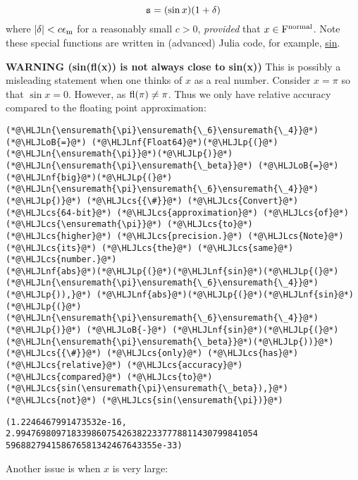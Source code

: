 \documentclass[12pt,a4paper]{article}
\newcommand{\HLJLn}[1]{#1}
\newcommand{\HLJLnf}[1]{\textcolor[RGB]{66,102,213}{#1}}
\newcommand{\HLJLoB}[1]{\textcolor[RGB]{102,102,102}{\textbf{#1}}}
\newcommand{\HLJLp}[1]{#1}
\newcommand{\HLJLcs}[1]{\textcolor[RGB]{153,153,119}{\textit{#1}}}
\begin{document}
\[
{\tt s} = (\sin x) ( 1 + \delta)
\]
where $|\delta| < c\ensuremath{\epsilon}_{\rm m}$ for a reasonably small $c > 0$, \emph{provided} that $x \in {\rm F}^{\rm normal}$. Note these special functions are written in (advanced) Julia code, for example, \href{https://github.com/JuliaLang/julia/blob/d08b05df6f01cf4ec6e4c28ad94cedda76cc62e8/base/special/trig.jl#L76}{sin}.

\textbf{WARNING (sin(fl(x)) is not always close to sin(x))} This is possibly a misleading statement when one thinks of $x$ as a real number. Consider $x = \pi$ so that $\sin x = 0$. However, as ${\rm fl}(\pi) \neq \pi$. Thus we only have relative accuracy compared to the floating point approximation:


\begin{lstlisting}
(*@\HLJLn{\ensuremath{\pi}\ensuremath{\_6}\ensuremath{\_4}}@*) (*@\HLJLoB{=}@*) (*@\HLJLnf{Float64}@*)(*@\HLJLp{(}@*)(*@\HLJLn{\ensuremath{\pi}}@*)(*@\HLJLp{)}@*)
(*@\HLJLn{\ensuremath{\pi}\ensuremath{\_beta}}@*) (*@\HLJLoB{=}@*) (*@\HLJLnf{big}@*)(*@\HLJLp{(}@*)(*@\HLJLn{\ensuremath{\pi}\ensuremath{\_6}\ensuremath{\_4}}@*)(*@\HLJLp{)}@*) (*@\HLJLcs{{\#}}@*) (*@\HLJLcs{Convert}@*) (*@\HLJLcs{64-bit}@*) (*@\HLJLcs{approximation}@*) (*@\HLJLcs{of}@*) (*@\HLJLcs{\ensuremath{\pi}}@*) (*@\HLJLcs{to}@*) (*@\HLJLcs{higher}@*) (*@\HLJLcs{precision.}@*) (*@\HLJLcs{Note}@*) (*@\HLJLcs{its}@*) (*@\HLJLcs{the}@*) (*@\HLJLcs{same}@*) (*@\HLJLcs{number.}@*)
(*@\HLJLnf{abs}@*)(*@\HLJLp{(}@*)(*@\HLJLnf{sin}@*)(*@\HLJLp{(}@*)(*@\HLJLn{\ensuremath{\pi}\ensuremath{\_6}\ensuremath{\_4}}@*)(*@\HLJLp{)),}@*) (*@\HLJLnf{abs}@*)(*@\HLJLp{(}@*)(*@\HLJLnf{sin}@*)(*@\HLJLp{(}@*)(*@\HLJLn{\ensuremath{\pi}\ensuremath{\_6}\ensuremath{\_4}}@*)(*@\HLJLp{)}@*) (*@\HLJLoB{-}@*) (*@\HLJLnf{sin}@*)(*@\HLJLp{(}@*)(*@\HLJLn{\ensuremath{\pi}\ensuremath{\_beta}}@*)(*@\HLJLp{))}@*) (*@\HLJLcs{{\#}}@*) (*@\HLJLcs{only}@*) (*@\HLJLcs{has}@*) (*@\HLJLcs{relative}@*) (*@\HLJLcs{accuracy}@*) (*@\HLJLcs{compared}@*) (*@\HLJLcs{to}@*) (*@\HLJLcs{sin(\ensuremath{\pi}\ensuremath{\_beta}),}@*) (*@\HLJLcs{not}@*) (*@\HLJLcs{sin(\ensuremath{\pi})}@*)
\end{lstlisting}

\begin{lstlisting}
(1.2246467991473532e-16, 2.994769809718339860754263822337778811430799841054
596882794158676581342467643355e-33)
\end{lstlisting}


Another issue is when $x$ is very large:
\end{document}
